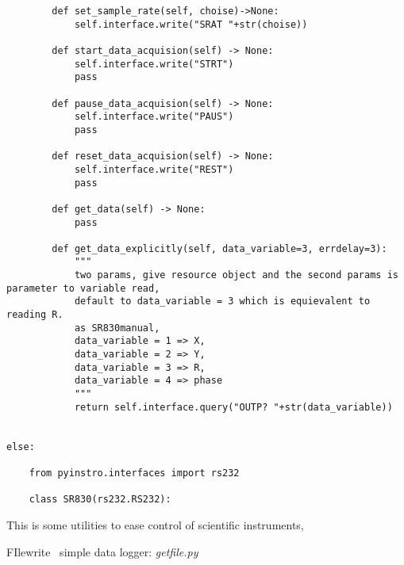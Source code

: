 \begin{verbatim}
        def set_sample_rate(self, choise)->None:
            self.interface.write("SRAT "+str(choise))

        def start_data_acquision(self) -> None:
            self.interface.write("STRT")
            pass

        def pause_data_acquision(self) -> None:
            self.interface.write("PAUS")
            pass

        def reset_data_acquision(self) -> None:
            self.interface.write("REST")
            pass

        def get_data(self) -> None:
            pass

        def get_data_explicitly(self, data_variable=3, errdelay=3):
            """
            two params, give resource object and the second params is parameter to variable read,
            default to data_variable = 3 which is equievalent to reading R.
            as SR830manual, 
            data_variable = 1 => X,
            data_variable = 2 => Y,
            data_variable = 3 => R,
            data_variable = 4 => phase
            """
            return self.interface.query("OUTP? "+str(data_variable))

        
else:

    from pyinstro.interfaces import rs232
    
    class SR830(rs232.RS232):
\end{verbatim}

This is some utilities to ease control of scientific instruments,

FIlewrite \ simple data logger: \emph{getfile.py}

